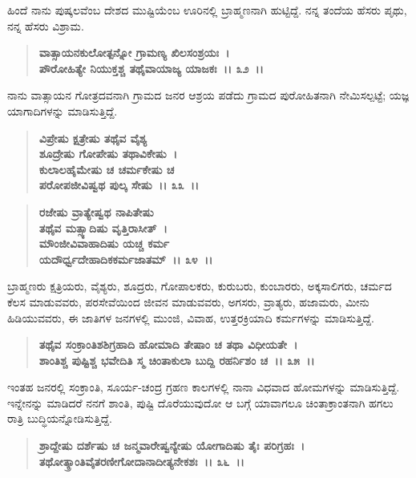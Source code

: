 ಹಿಂದೆ ನಾನು ಪುಷ್ಕಲವೆಂಬ ದೇಶದ ಮುಷ್ಟಿಯೆಂಬ ಊರಿನಲ್ಲಿ ಬ್ರಾಹ್ಮಣನಾಗಿ ಹುಟ್ಟಿದ್ದೆ. ನನ್ನ ತಂದೆಯ ಹೆಸರು ಪೃಥು, ನನ್ನ ಹೆಸರು ವಿಶ್ರಾಮ.

\begin{verse}
\textbf{ವಾತ್ಸಾಯನಕುಲೋತ್ಪನ್ನೋ ಗ್ರಾಮಣ್ಯ ಖಿಲಸಂಶ್ರಯಃ~।}\\\textbf{ಪೌರೋಹಿತ್ಯೇ ನಿಯುಕ್ತಶ್ಚ ತಥೈವಾಯಾಜ್ಯ ಯಾಜಕಃ~।। ೩೨~।।}
\end{verse}

ನಾನು ವಾತ್ಸಾಯನ ಗೋತ್ರದವನಾಗಿ ಗ್ರಾಮದ ಜನರ ಆಶ್ರಯ ಪಡೆದು ಗ್ರಾಮದ ಪುರೋಹಿತನಾಗಿ ನೇಮಿಸಲ್ಪಟ್ಟೆ; ಯಜ್ಞ ಯಾಗಾದಿಗಳನ್ನು ಮಾಡಿಸುತ್ತಿದ್ದೆ.

\begin{verse}
\textbf{ವಿಪ್ರೇಷು ಕ್ಷತ್ರೇಷು ತಥೈವ ವೈಶ್ಯ\enginline{-}}\\\textbf{ಶೂದ್ರೇಷು ಗೋಪೇಷು ತಥಾವಿಕೇಷು~।}\\\textbf{ಕುಲಾಲಹೈಮೇಷು ಚ ಚರ್ಮಕೇಷು ಚ} \\\textbf{ಪರೋಪಜೀವಿಷ್ವಥ ಪುಲ್ಕ ಸೇಷು~।। ೩೩~।।}
\end{verse}

\begin{verse}
\textbf{ರಜೇಷು ವ್ರಾತ್ಯೇಷ್ವಥ ನಾಪಿತೇಷು}\\\textbf{ತಥೈವ ಮತ್ಸ್ಯಾದಿಷು ವೃತ್ತಿರಾಸೀತ್~।}\\\textbf{ಮೌಂಜೀವಿವಾಹಾದಿಷು ಯಚ್ಚ ಕರ್ಮ}\\\textbf{ಯದೌರ್ಧ್ವದೇಹಾದಿಕಕರ್ಮಜಾತಮ್~।। ೩೪~।।}
\end{verse}

ಬ್ರಾಹ್ಮಣರು ಕ್ಷತ್ರಿಯರು, ವೈಶ್ಯರು, ಶೂದ್ರರು, ಗೋಪಾಲಕರು, ಕುರುಬರು, ಕುಂಬಾರರು, ಅಕ್ಕಸಾಲಿಗರು, ಚರ್ಮದ ಕೆಲಸ ಮಾಡುವವರು, ಪರಸೇವೆಯಿಂದ ಜೀವನ ಮಾಡುವವರು, ಅಗಸರು, ವ್ರಾತ್ಯರು, ಹಜಾಮರು, ಮೀನು ಹಿಡಿಯುವವರು, ಈ ಜಾತಿಗಳ ಜನಗಳಲ್ಲಿ ಮುಂಜಿ, ವಿವಾಹ, ಉತ್ತರಕ್ರಿಯಾದಿ ಕರ್ಮಗಳನ್ನು ಮಾಡಿಸುತ್ತಿದ್ದೆ.

\begin{verse}
\textbf{ತಥೈವ ಸಂಕ್ರಾಂತಿಶಶಿಗ್ರಹಾದಿ ಹೋಮಾದಿ ತೇಷಾಂ ಚ ತಥಾ ವಿಧೀಯತೇ~।}\\\textbf{ಶಾಂತಿಶ್ಚ ಪುಷ್ಟಿಶ್ಚ ಭವೇದಿತಿ ಸ್ಮ ಚಿಂತಾಕುಲಾ ಬುದ್ದಿ ರಹರ್ನಿಶಂ ಚ~।। ೩೫~।।}
\end{verse}

ಇಂತಹ ಜನರಲ್ಲಿ ಸಂಕ್ರಾಂತಿ, ಸೂರ್ಯ-ಚಂದ್ರ ಗ್ರಹಣ ಕಾಲಗಳಲ್ಲಿ ನಾನಾ ವಿಧವಾದ ಹೋಮಗಳನ್ನು ಮಾಡಿಸುತ್ತಿದ್ದೆ. ಇನ್ನೇನನ್ನು ಮಾಡಿದರೆ ನನಗೆ ಶಾಂತಿ, ಪುಷ್ಟಿ ದೊರೆಯುವುದೋ ಆ ಬಗ್ಗೆ ಯಾವಾಗಲೂ ಚಿಂತಾಕ್ರಾಂತನಾಗಿ ಹಗಲು ರಾತ್ರಿ ಬುದ್ಧಿಯನ್ನೋಡಿಸುತ್ತಿದ್ದೆ.

\begin{verse}
\textbf{ಶ್ರಾದ್ದೇಷು ದರ್ಶೆಷು ಚ ಜನ್ಮವಾರೇಷ್ವನ್ಯೇಷು ಯೋಗಾದಿಷು ತೈಃ ಪರಿಗ್ರಹಃ~।}\\\textbf{ತಥೋತ್ಕ್ರಾಂತಿವೈತರಣೀಗೋದಾನಾದೀತ್ಯನೇಕಶಃ~।। ೩೬~।।}
\end{verse}

